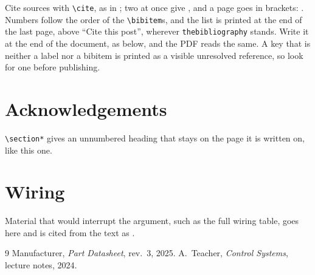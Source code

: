 Cite sources with \texttt{\textbackslash{}cite}, as in \cite{datasheet}; two at once give \cite{datasheet,lecture}, and a page goes in brackets: \cite[p.~12]{datasheet}. Numbers follow the order of the \texttt{\textbackslash{}bibitem}s, and the list is printed at the end of the last page, above ``Cite this post'', wherever \texttt{thebibliography} stands. Write it at the end of the document, as below, and the PDF reads the same. A key that is neither a label nor a bibitem is printed as a visible unresolved reference, so look for one before publishing.

\section*{Acknowledgements}

\texttt{\textbackslash{}section*} gives an unnumbered heading that stays on the page it is written on, like this one.

\clearpage
\appendix

\section{Wiring}
\label{app:wiring}

Material that would interrupt the argument, such as the full wiring table, goes here and is cited from the text as .

\begin{thebibliography}{9}
 Manufacturer, \emph{Part Datasheet}, rev.~3, 2025.
 A.~Teacher, \emph{Control Systems}, lecture notes, 2024.
\end{thebibliography}


